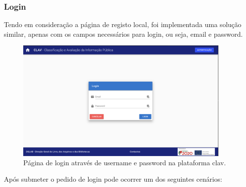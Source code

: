 \vspace{-4mm}
\subsubsection{Login}

Tendo em consideração a página de registo local, foi implementada uma solução similar, apenas com os campos necessários para login, ou seja, email e password.

\begin{figure}[h!]
    \centering
    \includegraphics[width=0.95\textwidth]{img/clav/authlocal/login.png}
    \caption{Página de login através de username e password na plataforma \gls{clav}.}
    \label{fig:paginaLoginLocal}
\end{figure}

\vspace{-5mm}
Após submeter o pedido de login pode ocorrer um dos seguintes cenários:


